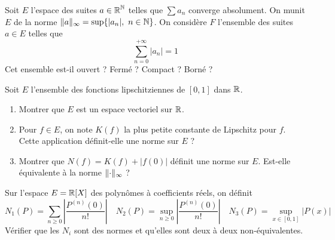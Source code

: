 \documentclass[10pt]{scrartcl}
\begin{document}
    \begin{exo}
        Soit $E$ l'espace des suites $a\in\operatorname{\mathbb R}^{\operatorname{\mathbb N}}$ telles que $\sum a_n$ converge absolument. 
        On munit $E$ de la norme $\lVert a\rVert_\infty=\sup\lbrace |a_n|,\ n\in\operatorname{\mathbb N}\rbrace$.
        On considère $F$ l'ensemble des suites $a\in E$ telles que 
        \[
            \sum_{n=0}^{+\infty}|a_n|=1
        \]
        Cet ensemble est-il ouvert ? Fermé ? Compact ? Borné ?
    \end{exo}

    \begin{exo}
        Soit $E$ l'ensemble des fonctions lipschitziennes de $[0,1]$ dans $\operatorname{\mathbb R}$.
        \begin{enumerate}
            \item Montrer que $E$ est un espace vectoriel sur $\operatorname{\mathbb R}$. 
            \item Pour $f\in E$, on note $K(f)$ la plus petite constante de Lipschitz pour $f$. Cette application définit-elle une norme sur $E$ ?
            \item Montrer que $N(f)=K(f)+|f(0)|$ définit une norme sur $E$. Est-elle équivalente à la norme $\lVert \cdot\rVert_\infty$ ?
        \end{enumerate}
    \end{exo}

    \begin{exo}
        Sur l'espace $E=\operatorname{\mathbb R}[X]$ des polynômes à coefficients réels, on définit 
        \[
            N_1(P)=\sum_{n\geq 0}\left|\frac{P^{(n)}(0)}{n!}\right|\quad N_2(P)=\sup_{n\geq 0}\left|\frac{P^{(n)}(0)}{n!}\right|\quad N_3(P)=\sup_{x\in[0,1]}|P(x)|
        \]
        Vérifier que les $N_i$ sont des normes et qu'elles sont deux à deux non-équivalentes.
    \end{exo}

    \newpage
\end{document}
